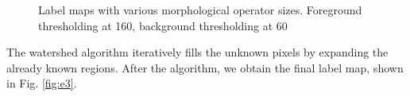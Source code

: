 \documentclass[11pt,a4paper]{article}
\begin{document}
\begin{figure}
\quad
{}
\quad

\caption{Label maps with various morphological operator sizes. Foreground thresholding at 160, background thresholding at 60}%
\label{fig:e2}
\end{figure}

The watershed algorithm iteratively fills the unknown pixels by expanding the already known regions. After the algorithm, we obtain the final label map, shown in Fig. \ref{fig:e3}.
\end{document}
